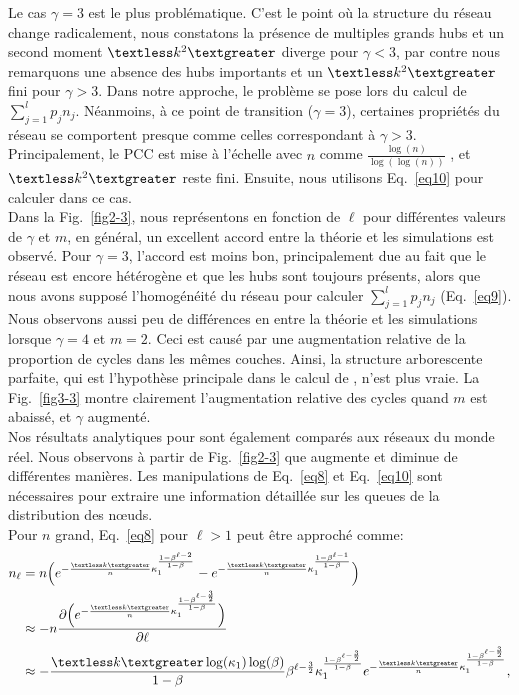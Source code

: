 Le cas $\gamma=3$ est le plus problématique. C'est le point où la structure du réseau change radicalement, nous constatons la présence de multiples grands hubs et un second moment  $\textless k^2 \textgreater$ diverge pour $\gamma<3$, par contre nous remarquons une absence des hubs importants et un $\textless k^2  \textgreater$ fini pour $\gamma>3$.
Dans notre approche, le problème se pose lors du calcul de $\sum_{j=1}^{l}p_jn_j$. Néanmoins, à ce point de transition ($\gamma=3$), certaines propriétés du réseau se comportent presque comme celles correspondant à $\gamma>3$.
Principalement, le PCC est mise à l'échelle avec $n$ comme $\frac {\log(n)}{\log(\log(n))}$ \cite{Bollobas-Riordan2004}, et $\textless k^2  \textgreater$ reste fini. Ensuite, nous utilisons Eq.~\eqref{eq10} pour calculer \nl dans ce cas. \\
Dans la Fig.~\ref{fig2-3}, nous représentons \nl en fonction de $\ell$ pour différentes valeurs de $\gamma$ et $m$, en général, un excellent accord entre la théorie et les simulations est observé. Pour $\gamma=3$, l'accord est moins bon, principalement due au fait que le réseau est encore hétérogène et que les hubs sont toujours présents, alors que nous avons supposé l'homogénéité du réseau pour calculer $\sum_{j=1}^{l} p_jn_j$ (Eq.~\eqref{eq9}). Nous observons aussi peu de différences en \nl entre la théorie et les simulations lorsque $ \gamma = 4 $ et $ m = 2 $. Ceci est causé par une augmentation relative de la proportion de cycles dans les mêmes couches. Ainsi, la structure arborescente parfaite, qui est l'hypothèse principale dans le calcul de \nl, n'est plus vraie. La Fig.~\ref{fig3-3} montre clairement l'augmentation relative des cycles quand $ m $ est abaissé, et $ \gamma $ augmenté.\\
Nos résultats analytiques pour \nl sont également comparés aux réseaux du monde réel. Nous observons à partir de Fig.~\ref{fig2-3} que \nl augmente et diminue de différentes manières. Les manipulations de Eq.~\eqref{eq8} et Eq.~\eqref {eq10} sont nécessaires pour extraire une information détaillée sur les queues de la distribution des nœuds. \\ Pour $n$ grand, Eq.~\eqref{eq8} pour $\ell>1$ peut être approché comme:
\begin{align}
n_{\ell}&=n\Big(e^{-\frac{\km}{n}\kappa_1^{\frac{1-\beta^{\ell-2}}{1-\beta}}}-e^{-\frac{\km}{n}\kappa_1^{\frac{1-\beta^{\ell-1}}{1-\beta}}}\Big) \nonumber \\
&\approx -n \frac{\partial \Big(e^{-\frac{\km}{n}\kappa_1^{\frac{1-\beta^{\ell-\frac{3}{2}}}{1-\beta}}} \Big) }{\partial \ell} \nonumber \\
&\approx -\frac {\km \log(\kappa_1) \log(\beta)} {1-\beta} \beta^{\ell-\frac{3}{2}} \kappa_1^{\frac{1-\beta^{\ell-\frac{3}{2}}}{1-\beta}}e^{-\frac{\km}{n}\kappa_1^{\frac{1-\beta^{\ell-\frac{3}{2}}}{1-\beta}}}, 
\label{eq11}
\end{align}
